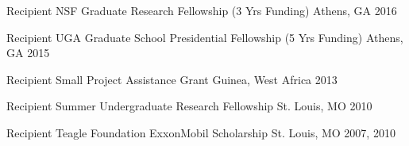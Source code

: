 \begin{cvhonors}
  \cvhonor
    {Recipient} %
    {NSF Graduate Research Fellowship (3 Yrs Funding)} %
    {Athens, GA} %
    {2016} %

  \cvhonor
    {Recipient} %
    {UGA Graduate School Presidential Fellowship (5 Yrs Funding)} %
    {Athens, GA} %
    {2015} %

  \cvhonor
    {Recipient} %
    {Small Project Assistance Grant} %
    {Guinea, West Africa} %
    {2013} %
    
  \cvhonor
    {Recipient} %
    {Summer Undergraduate Research Fellowship} %
    {St. Louis, MO} %
    {2010} %

  \cvhonor
    {Recipient} %
    {Teagle Foundation ExxonMobil Scholarship} %
    {St. Louis, MO} %
    {2007, 2010} %

\end{cvhonors}
    



